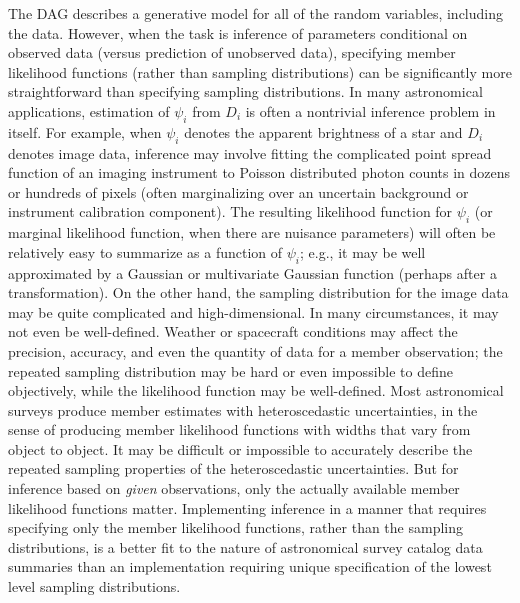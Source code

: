 The DAG describes a generative model for all of the random variables, including the data.
However, when the task is inference of parameters conditional on observed data (versus prediction of unobserved data), specifying member likelihood functions (rather than sampling distributions) can be significantly more straightforward than specifying sampling distributions.
In many astronomical applications, estimation of $\psi_i$ from $D_i$ is often a nontrivial inference problem in itself.
For example, when $\psi_i$ denotes the apparent brightness of a star and $D_i$ denotes image data, inference may involve fitting the complicated point spread function of an imaging instrument to Poisson distributed photon counts in dozens or hundreds of pixels (often marginalizing over an uncertain background or instrument calibration component).
The resulting likelihood function for $\psi_i$ (or marginal likelihood function, when there are nuisance parameters) will often be relatively easy to summarize as a function of $\psi_i$; e.g., it may be well approximated by a Gaussian or multivariate Gaussian function (perhaps after a transformation).
On the other hand, the sampling distribution for the image data may be quite complicated and high-dimensional.
In many circumstances, it may not even be well-defined.
Weather or spacecraft conditions may affect the precision, accuracy, and even the quantity of data for a member observation; the repeated sampling distribution may be hard or even impossible to define objectively, while the likelihood function may be well-defined.
Most astronomical surveys produce member estimates with heteroscedastic uncertainties, in the sense of producing member likelihood functions with widths that vary from object to object.
It may be difficult or impossible to accurately describe the repeated sampling properties of the heteroscedastic uncertainties.
But for inference based on \emph{given} observations, only the actually available member likelihood functions matter.
Implementing inference in a manner that requires specifying only the member likelihood functions, rather than the sampling distributions, is a better fit to the nature of astronomical survey catalog data summaries than an implementation requiring unique specification of the lowest level sampling distributions.

